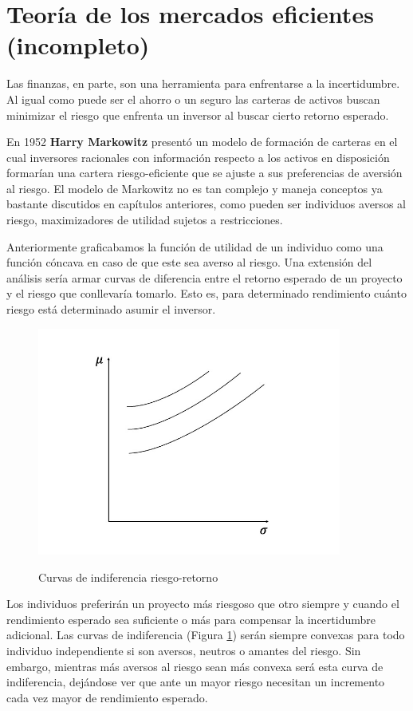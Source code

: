 \section{Teoría de los mercados eficientes (incompleto)}
Las finanzas, en parte, son una herramienta para enfrentarse a la incertidumbre. Al igual como puede ser el ahorro o un seguro las carteras de activos buscan minimizar el riesgo que enfrenta un inversor al buscar cierto retorno esperado. 

En 1952 \textbf{Harry Markowitz} presentó un modelo de formación de carteras en el cual inversores racionales con información respecto a los activos en disposición formarían una cartera riesgo-eficiente que se ajuste a sus preferencias de aversión al riesgo. El modelo de Markowitz no es tan complejo y maneja conceptos ya bastante discutidos en capítulos anteriores, como pueden ser individuos aversos al riesgo, maximizadores de utilidad sujetos a restricciones.

Anteriormente graficabamos la función de utilidad de un individuo como una función cóncava en caso de que este sea averso al riesgo. Una extensión del análisis sería armar curvas de diferencia entre el retorno esperado de un proyecto y el riesgo que conllevaría tomarlo. Esto es, para determinado rendimiento cuánto riesgo está determinado asumir el inversor. 
\begin{figure}[ht]
    \centering
    \caption{Curvas de indiferencia riesgo-retorno}
    \includegraphics[width=10cm]{Figuras/Curvas de indiferencia riesgo-retorno.jpeg}
    \label{fig: Curvas de indiferencia riesgo-retorno}
\end{figure}
Los individuos preferirán un proyecto más riesgoso que otro siempre y cuando el rendimiento esperado sea suficiente o más para compensar la incertidumbre adicional. Las curvas de indiferencia (Figura \ref{fig: Curvas de indiferencia riesgo-retorno}) serán siempre convexas para todo individuo independiente si son aversos, neutros o amantes del riesgo. Sin embargo, mientras más aversos al riesgo sean más convexa será esta curva de indiferencia, dejándose ver que ante un mayor riesgo necesitan un incremento cada vez mayor de rendimiento esperado.


